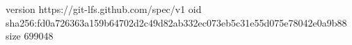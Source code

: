 version https://git-lfs.github.com/spec/v1
oid sha256:fd0a726363a159b64702d2c49d82ab332ec073eb5c31e55d075e78042e0a9b88
size 699048
